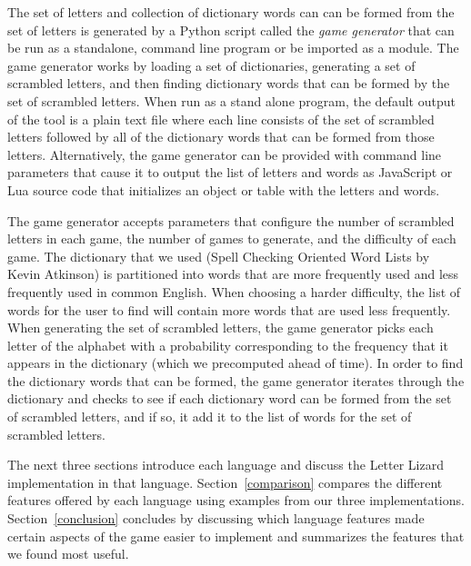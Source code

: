 
The set of letters and collection of dictionary words can can be formed from the set of letters
is generated by a Python script called the \emph{game generator} that can be run as a standalone,
command line program or be imported as a module. The game generator works by loading a set
of dictionaries, generating a set of scrambled letters, and then finding dictionary words that can
be formed by the set of scrambled letters. When run as a stand alone program, the default output of the
tool is a plain text file where each line consists of the set of scrambled letters followed by all of the 
dictionary words that can be formed from those letters. Alternatively, the game generator can be provided
with command line parameters that cause it to output the list of letters and words as JavaScript or Lua 
source code that initializes an object or table with the letters and words.

The game generator accepts parameters that configure the
number of scrambled letters in each game, the number of games to generate, and the difficulty
of each game. The dictionary that we used (Spell Checking Oriented Word Lists by Kevin
Atkinson) is partitioned into words that are more frequently used and less frequently used in
common English. When choosing a harder difficulty, the list of words for the user to find will
contain more words that are used less frequently.
When generating the set of scrambled letters, the game generator picks each letter of the alphabet with a
probability corresponding to the frequency that it appears in the dictionary (which we
precomputed ahead of time). In order to find the dictionary words that can be formed, the game generator
iterates through the dictionary and checks to see if each dictionary word can be formed from the set of 
scrambled letters, and if so, it add it to the list of words for the set of scrambled letters.

The next three sections introduce each language and discuss the Letter Lizard implementation in
that language. Section~\ref{comparison} compares the different features offered by each language using
examples from our three implementations. Section~\ref{conclusion} concludes by discussing which
language features made certain aspects of the game easier to implement and summarizes the features
that we found most useful.